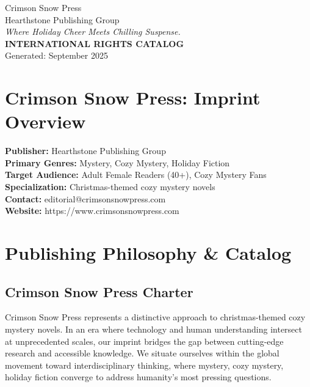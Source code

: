 \documentclass[11pt]{article}
\begin{document}
\thispagestyle{firstpage}

\begin{center}
{\Huge \textcolor{primarycolor}{Crimson Snow Press}}\\[0.3cm]
{\Large \textcolor{secondarycolor}{Hearthstone Publishing Group}}\\[0.2cm]
{\large \textit{Where Holiday Cheer Meets Chilling Suspense.}}\\[0.5cm]
{\large \textbf{INTERNATIONAL RIGHTS CATALOG}}\\[0.3cm]
{\normalsize Generated: September 2025}
\end{center}

\vspace{1cm}

\section{Crimson Snow Press: Imprint Overview}

\textbf{Publisher:} Hearthstone Publishing Group\\
\textbf{Primary Genres:} Mystery, Cozy Mystery, Holiday Fiction\\
\textbf{Target Audience:} Adult Female Readers (40+), Cozy Mystery Fans\\
\textbf{Specialization:} Christmas-themed cozy mystery novels\\
\textbf{Contact:} editorial@crimsonsnowpress.com\\
\textbf{Website:} https://www.crimsonsnowpress.com\\

\vspace{1cm}

\section{Publishing Philosophy \& Catalog}

\subsection{Crimson Snow Press Charter}

Crimson Snow Press represents a distinctive approach to christmas-themed cozy mystery novels. In an era where technology and human understanding intersect at unprecedented scales, our imprint bridges the gap between cutting-edge research and accessible knowledge. We situate ourselves within the global movement toward interdisciplinary thinking, where mystery, cozy mystery, holiday fiction converge to address humanity's most pressing questions.
\end{document}
